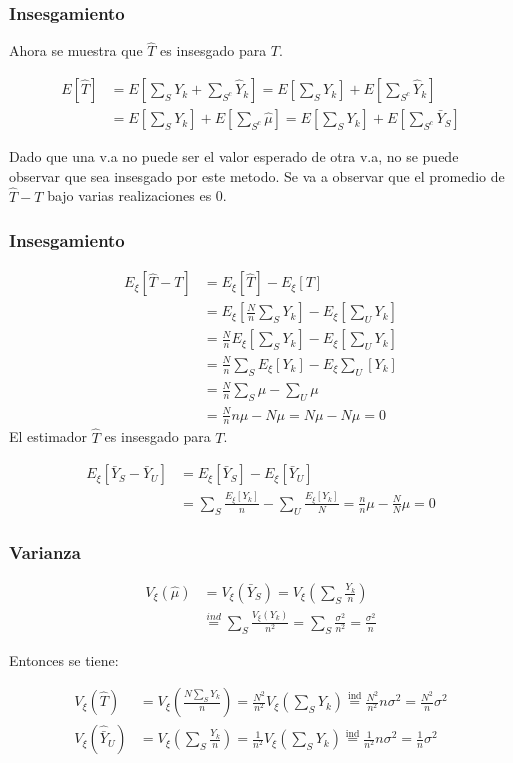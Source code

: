﻿\documentclass{beamer}
\begin{document}
\begin{frame}[allowframebreaks*]
\frametitle{Insesgamiento}
Ahora se muestra que $\hat T$ es insesgado para $T$.

\begin{align*}
E[\hat T]&=E[\sum_S Y_k+\sum_{S^c}\hat Y_k]=E[\sum_S Y_k]+E[\sum_{S^c}\hat Y_k] \\
&=E[\sum_S Y_k]+E[\sum_{S^c}\hat \mu]=E[\sum_S Y_k]+E[\sum_{S^c}\bar Y_S]
\end{align*}

Dado que una v.a no puede ser el valor esperado de otra v.a, no se puede observar que sea insesgado por este metodo. Se va a observar que el promedio de $\hat T-T$ bajo varias realizaciones es 0.
\end{frame}

\begin{frame}[allowframebreaks*]
\frametitle{Insesgamiento}
{\footnotesize
\begin{align*}
E_\xi[\hat T-T]&=E_\xi[\hat T]-E_\xi[T]\\
&=E_\xi\left[\frac{N}{n}\sum_SY_k\right]-E_\xi\left[\sum_UY_k\right]\\
&=\frac{N}{n}E_\xi\left[\sum_SY_k\right]-E_\xi\left[\sum_UY_k\right]\\
&=\frac{N}{n}\sum_SE_\xi\left[Y_k\right]-E_\xi\sum_U\left[Y_k\right]\\
&=\frac{N}{n}\sum_S\mu-\sum_U\mu\\
&=\frac{N}{n}n\mu-N\mu=N\mu-N\mu=0
\end{align*}
El estimador $\hat T$ es insesgado para $T$.

\begin{align*}
E_\xi[\bar Y_S-\bar Y_U]&=E_\xi[\bar Y_S]-E_\xi[\bar Y_U]\\
&=\sum_S\frac{E_\xi[Y_k]}{n}-\sum_U\frac{E_\xi[Y_k]}{N}=\frac{n}{n}\mu-\frac{N}{N}\mu=0
\end{align*}
}
\end{frame}

\begin{frame}[allowframebreaks*]
\frametitle{Varianza}
\begin{align*}
V_{\xi}(\hat\mu)&=V_\xi(\bar Y_S)=V_\xi\left(\sum_S\frac{Y_k}{n}\right)\\
&\stackrel{ind}{=}\sum_S\frac{V_\xi(Y_k)}{n^2}=\sum_S\frac{\sigma^2}{n^2}=\frac{\sigma^2}{n}
\end{align*}

Entonces se tiene:

\begin{align*}
V_\xi(\hat T)&=V_\xi\left(\frac{N\sum_S Y_k}{n}\right)=\frac{N^2}{n^2}V_\xi(\sum_SY_k)\stackrel{\text{ind}}{=}\frac{N^2}{n^2}n\sigma^2=\frac{N^2}{n}\sigma^2\\
V_\xi(\hat {\bar {Y}}_U)&=V_\xi\left(\sum_S\frac{Y_k}{n}\right)=\frac{1}{n^2}V_\xi(\sum_S Y_k)\stackrel{\text{ind}}{=}\frac{1}{n^2}n\sigma^2=\frac{1}{n}\sigma^2
\end{align*}
\end{frame}
\end{document}
